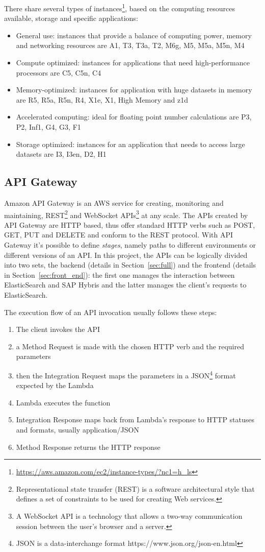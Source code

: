 There share several types of instances\footnote{\url{https://aws.amazon.com/ec2/instance-types/?nc1=h_ls}},
based on the computing resources available, storage and specific applications:
\begin{itemize}
  \item General use: instances that provide a balance of computing power, memory and networking resources are A1, T3, T3a, T2, M6g, M5, M5a, M5n, M4
  \item Compute optimized: instances for applications that need high-performance processors are C5, C5n, C4
  \item Memory-optimized: instances for application with huge datasets in memory are R5, R5a, R5n, R4, X1e, X1, High Memory and z1d
  \item Accelerated computing: ideal for floating point number calculations are P3, P2, Inf1, G4, G3, F1
  \item Storage optimized: instances for an application that needs to access large datasets are I3, I3en, D2, H1 
\end{itemize}


\subsection{API Gateway}
\label{sec:api_gateway}
Amazon API Gateway is an AWS service for creating, monitoring and
maintaining, REST\footnote{Representational state transfer (REST) is a
  software architectural style that defines a set of constraints to be
  used for creating Web services.}  and WebSocket APIs\footnote{A
  WebSocket API is a technology that allows a two-way communication
  session between the user's browser and a server.} at any scale.  The
APIs created by API Gateway are HTTP based, thus offer standard HTTP
verbs such as POST, GET, PUT and DELETE and conform to the REST
protocol.  With API Gateway it's possible to define \textit{stages},
namely paths to different environments or different versions of an
API.  In this project, the APIs can be logically divided into two
sets, the backend (details in Section~\ref{sec:full}) and the frontend
(details in Section~\ref{sec:front_end}): the first one manages the
interaction between ElasticSearch and SAP Hybris and the latter
manages the client's requests to ElasticSearch.

The execution flow of an API invocation usually follows these steps:
\begin{enumerate}
  \item The client invokes the API
  \item a Method Request is made with the chosen HTTP verb and the required parameters 
  \item then the Integration Request  maps the parameters in a JSON\footnote{JSON is a data-interchange format https://www.json.org/json-en.html} format expected by the Lambda
  \item Lambda executes the function
  \item  Integration Response maps back from Lambda's response to HTTP statuses and formats, usually
  application/JSON
  \item Method Response returns the HTTP response
\end{enumerate}


